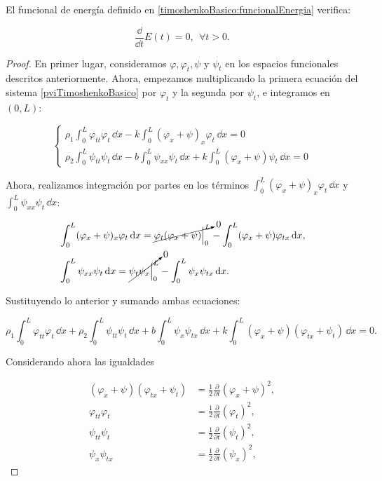 \begin{Proposicion}
    \label{ch:teoriaVigas:prop:ConservacionEnergiaTimoshenkoBasico}

    El funcional de energía definido en \eqref{timoshenkoBasico:funcionalEnergia} verifica:

    \[\frac{\dd}{\dd t}E(t) = 0, \ \ \forall t > 0.\]
\end{Proposicion}

\begin{proof}
    En primer lugar, consideramos $\varphi, \varphi_t, \psi$ y $\psi_t$ en los espacios funcionales descritos anteriormente. Ahora, empezamos multiplicando la primera ecuación del sistema \eqref{pviTimoshenkoBasico} por $\varphi_t$ y la segunda por $\psi_t$, e integramos en $(0,L)$:

    \begin{equation*}
    \begin{cases}
    \displaystyle \rho_1 \int_0^L \varphi_{tt} \varphi_t \, \dd x - k \int_0^L (\varphi_x + \psi)_x \varphi_t \, \dd x = 0\\
    \displaystyle \rho_2 \int_0^L \psi_{tt} \psi_t \, \dd x - b\int_0^L \psi_{xx}\psi_t \, \dd x + k \int_0^L (\varphi_x + \psi) \psi_t \, \dd x = 0
    \end{cases}
    \end{equation*}

    Ahora, realizamos integración por partes en los términos $\int_0^L (\varphi_x + \psi)_x \varphi_t \, \dd x$ y $\int_0^L \psi_{xx}\psi_t \, \dd x$:

    \begin{align*}
        &\int_0^L (\varphi_x + \psi)_x \varphi_t \, \mathrm{d} x = \cancelto{0}{\varphi_t(\varphi_x + \psi)\Big|_0^L} - \int_0^L(\varphi_x + \psi) \varphi_{tx} \, \mathrm{d} x,\\
        &\int_0^L \psi_{xx}\psi_t \, \mathrm{d} x = \cancelto{0}{\psi_t \psi_x\Big|_0^L} - \int_0^L \psi_x \psi_{tx} \, \mathrm{d} x.
    \end{align*}

    Sustituyendo lo anterior y sumando ambas ecuaciones:

    \[\rho_1 \int_0^L\varphi_{tt}\varphi_t \, \dd x + \rho_2 \int_0^L \psi_{tt}\psi_t \, \dd x + b\int_0^L \psi_x \psi_{tx} \, \dd x + k \int_0^L (\varphi_x + \psi)(\varphi_{tx} + \psi_t) \, \dd x = 0.\]

    Considerando ahora las igualdades

    \begin{align*}
        (\varphi_x + \psi)(\varphi_{tx} + \psi_t) &= \frac{1}{2}\frac{\partial}{\partial t}(\varphi_x + \psi)^2,\\
        \varphi_{tt}\varphi_t &= \frac{1}{2}\frac{\partial}{\partial t}(\varphi_t)^2,\\
        \psi_{tt}\psi_t &= \frac{1}{2}\frac{\partial}{\partial t}(\psi_t)^2,\\
        \psi_x \psi_{tx} &= \frac{1}{2}\frac{\partial}{\partial t}(\psi_x)^2,
    \end{align*}


\end{proof}
